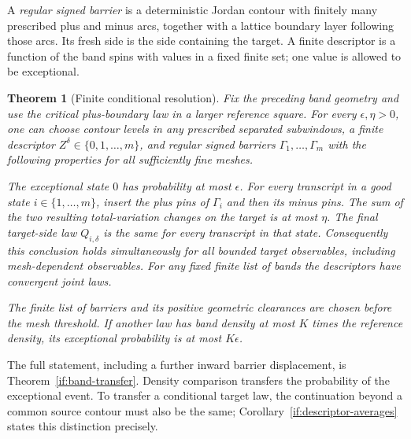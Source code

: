 \documentclass[11pt]{article}
\newtheorem{theorem}{Theorem}[section]
\theoremstyle{definition}
\theoremstyle{remark}
\numberwithin{equation}{section}
\begin{document}
A \emph{regular signed barrier} is a deterministic Jordan contour with
finitely many prescribed plus and minus arcs, together with a lattice
boundary layer following those arcs. Its fresh side is the side containing
the target. A finite descriptor is a function of the band spins with values
in a fixed finite set; one value is allowed to be exceptional.

\begin{theorem}[Finite conditional resolution]\label{in:resolution}
Fix the preceding band geometry and use the critical plus-boundary law
in a larger reference square. For every $\epsilon,\eta>0$, one can
choose contour levels in any prescribed separated subwindows,
a finite descriptor $Z^\delta\in\{0,1,\ldots,m\}$, and regular
signed barriers $\Gamma_1,\ldots,\Gamma_m$ with the following properties
for all sufficiently fine meshes.

The exceptional state $0$ has probability at most $\epsilon$. For every
transcript in a good state $i\in\{1,\ldots,m\}$, insert the plus pins of $\Gamma_i$ and
then its minus pins. The sum of the two resulting total-variation
changes on the target is at most $\eta$. The final target-side law
$Q_{i,\delta}$ is the same for every transcript in that state.
Consequently this conclusion holds simultaneously for all bounded target
observables, including mesh-dependent observables. For any fixed finite
list of bands the descriptors have convergent joint laws.

The finite list of barriers and its positive geometric clearances are
chosen before the mesh threshold. If another law has band density at
most $K$ times the reference density, its exceptional probability is
at most $K\epsilon$.
\end{theorem}

The full statement, including a further inward barrier displacement,
is Theorem~\ref{if:band-transfer}. Density comparison transfers the
probability of the exceptional event. To transfer a conditional target
law, the continuation beyond a common source contour must also be the
same; Corollary~\ref{if:descriptor-averages} states this distinction
precisely.
\end{document}
